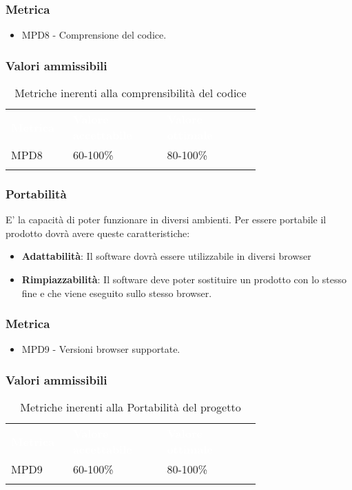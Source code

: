 \subsubsection{Metrica}
\begin{itemize}
    \item MPD8 - Comprensione del codice.
\end{itemize}
\subsubsection{Valori ammissibili}
\renewcommand{\arraystretch}{1.5}
\begin{longtable}{p{0.12\linewidth}p{0.30\linewidth}p{0.30\linewidth}}
	\rowcolor[RGB]{33, 73, 50}
	\textcolor{white}{\textbf{Metrica}} & \textcolor{white}{\textbf{Valore accettabile}} & \textcolor{white}{\textbf{Valore ottimale}}\\
    \rowcolor[RGB]{233, 245, 206}
    MPD8 & 60-100\% & 80-100\%\\ 
    \caption{Metriche inerenti alla comprensibilità del codice}
\end{longtable}	
\subsubsection{Portabilità}
E' la capacità di poter funzionare in diversi ambienti. Per essere portabile il prodotto dovrà
avere queste caratteristiche:
\begin{itemize}
    \item \textbf{Adattabilità}: Il software dovrà essere utilizzabile in diversi browser
    \item \textbf{Rimpiazzabilità}: Il software deve poter sostituire un prodotto con lo stesso fine e che viene eseguito sullo stesso browser.
\end{itemize}
\subsubsection{Metrica}
\begin{itemize}
    \item MPD9 - Versioni browser supportate.
\end{itemize}
\subsubsection{Valori ammissibili}
\renewcommand{\arraystretch}{1.5}
\begin{longtable}{p{0.12\linewidth}p{0.30\linewidth}p{0.30\linewidth}}
	\rowcolor[RGB]{33, 73, 50}
	\textcolor{white}{\textbf{Metrica}} & \textcolor{white}{\textbf{Valore accettabile}} & \textcolor{white}{\textbf{Valore ottimale}}\\
    \rowcolor[RGB]{233, 245, 206}
    MPD9 & 60-100\% & 80-100\%\\ 
    \caption{Metriche inerenti alla Portabilità del progetto}
\end{longtable}	
\newpage
